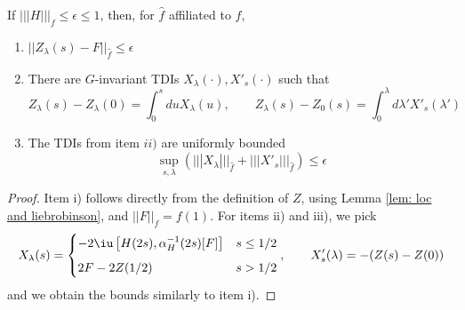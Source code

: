 \begin{lemma}\label{lem: loop is small}
	If  $|||H|||_f\leq  \epsilon \leq  1$, then, for $\hat{f}$ affiliated to $f$,
	\begin{enumerate}
		\item  $
		||Z_\lambda(s)-F||_{\hat{f}} \leq   \epsilon  
		$
		\item  There are $G$-invariant TDIs $X_\lambda(\cdot), X'_s(\cdot)$ such that 
		$$
		Z_{\lambda}(s)-Z_{\lambda}(0)=\int_{0}^{s} du X_\lambda(u), \qquad    Z_{\lambda}(s)-Z_{0}(s)=\int_{0}^{\lambda} d\lambda' X'_s(\lambda') 
		$$
		\item  The TDIs  from item $ii)$ are uniformly bounded 
		$$ \sup_{s,\lambda} (||| X_\lambda |||_{\hat{f}}+ ||| X'_s |||_{\hat{f}}) \leq \epsilon
		$$
	\end{enumerate}
\end{lemma}
\begin{proof}
	Item i) follows directly from the definition of $Z$, using Lemma \ref{lem: loc and liebrobinson}, and $||F||_f =f(1)$. 
	For items ii) and iii), we pick
	$$
	X_\lambda(s)= \begin{cases} -2\iu \left[H(2s),\alpha_H^{-1}(2s)[F]\right] &  s\leq 1/2  \\[2mm]
	2F-2Z(1/2)  & s>1/2  \end{cases},\qquad  X'_s(\lambda)= - (Z(s)-Z(0))
	$$ 
	and we obtain the bounds similarly to item i). 
\end{proof}

